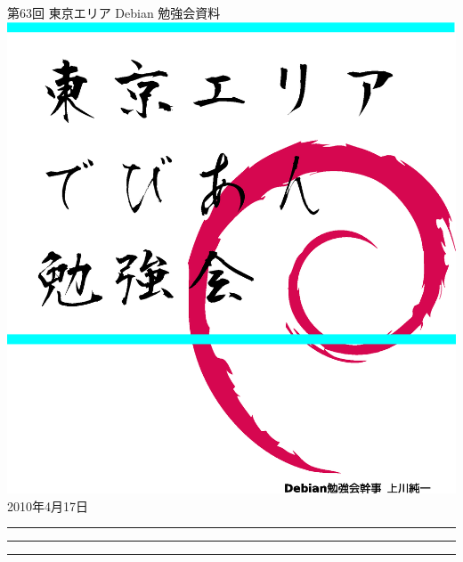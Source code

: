 \documentclass[mingoth,a4paper]{jsarticle}
\newcommand{\debmtgyear}{2010}
\newcommand{\debmtgmonth}{4}
\newcommand{\debmtgdate}{17}
\newcommand{\debmtgnumber}{63}
\begin{document}
\begin{titlepage}
\thispagestyle{empty}


\vspace*{-2cm}
第\debmtgnumber{}回 東京エリア Debian 勉強会資料\\
\hspace*{-2cm}
\includegraphics[width=210mm]{image201004/2010title.eps}\\
\hfill{}\debmtgyear{}年\debmtgmonth{}月\debmtgdate{}日



\vspace*{-2cm}
\end{titlepage}


\begin{minipage}[b]{0.2\hsize}
 \colorbox{titleback}{}
\end{minipage}
\begin{minipage}[b]{0.8\hsize}
\hrule
\vspace{2mm}
\hrule
\begin{multicols}{2}
\tableofcontents
\end{multicols}
\vspace{2mm}
\hrule
\end{minipage}
\end{document}
